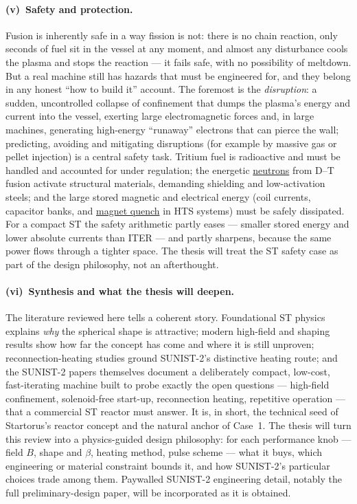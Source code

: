 \documentclass[11pt]{article}
\newcommand{\jl}[2]{\href{#2}{#1}}
\begin{document}
\paragraph{(v)~Safety and protection.}
Fusion is inherently safe in a way fission is not: there is no chain reaction, only seconds of fuel sit in the vessel at any moment, and almost any disturbance cools the plasma and stops the reaction --- it fails safe, with no possibility of meltdown.\cite{freidberg} But a real machine still has hazards that must be engineered for, and they belong in any honest ``how to build it'' account. The foremost is the \emph{disruption}: a sudden, uncontrolled collapse of confinement that dumps the plasma's energy and current into the vessel, exerting large electromagnetic forces and, in large machines, generating high-energy ``runaway'' electrons that can pierce the wall; predicting, avoiding and mitigating disruptions (for example by massive gas or pellet injection) is a central safety task.\cite{hender2007,boozer2012} Tritium fuel is radioactive and must be handled and accounted for under regulation; the energetic \jl{neutrons}{https://en.wikipedia.org/wiki/Neutron} from D--T fusion activate structural materials, demanding shielding and low-activation steels; and the large stored magnetic and electrical energy (coil currents, capacitor banks, and \jl{magnet quench}{https://en.wikipedia.org/wiki/Superconducting_magnet} in HTS systems) must be safely dissipated. For a compact ST the safety arithmetic partly eases --- smaller stored energy and lower absolute currents than ITER --- and partly sharpens, because the same power flows through a tighter space. The thesis will treat the ST safety case as part of the design philosophy, not an afterthought.\cite{tan_iaea,hender2007}

\paragraph{(vi)~Synthesis and what the thesis will deepen.}
The literature reviewed here tells a coherent story. Foundational ST physics\cite{peng1986,sykes1997} explains \emph{why} the spherical shape is attractive; modern high-field and shaping results\cite{mcnamara2024,nelson2024} show how far the concept has come and where it is still unproven; reconnection-heating studies\cite{ono2015,tanabe2015} ground SUNIST-2's distinctive heating route; and the SUNIST-2 papers themselves\cite{tan_iaea,cheng2022,li2025,sunist2design2025,sunist2control2024} document a deliberately compact, low-cost, fast-iterating machine built to probe exactly the open questions --- high-field confinement, solenoid-free start-up, reconnection heating, repetitive operation --- that a commercial ST reactor must answer. It is, in short, the technical seed of Startorus's reactor concept and the natural anchor of Case~1. The thesis will turn this review into a physics-guided design philosophy: for each performance knob --- field $B$, shape and $\beta$, heating method, pulse scheme --- what it buys, which engineering or material constraint bounds it, and how SUNIST-2's particular choices trade among them. Paywalled SUNIST-2 engineering detail, notably the full preliminary-design paper,\cite{sunist2design2025} will be incorporated as it is obtained.
\end{document}
